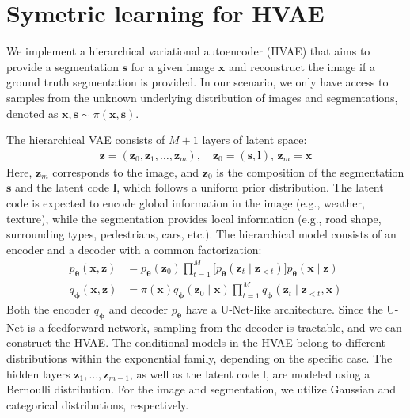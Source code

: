 \section{Symetric learning for HVAE}\label{sec:sym_learning_adaptation}
We implement a hierarchical variational autoencoder (HVAE) that aims to provide a segmentation 
$\mathbf{s}$ for a given image $\mathbf{x}$ and reconstruct the image if a ground truth segmentation is provided. 
In our scenario, we only have access to samples from the unknown underlying distribution of images and
segmentations, denoted as $\mathbf{x}, \mathbf{s} \sim \pi(\mathbf{x},\mathbf{s})$.

The hierarchical VAE consists of $M+1$ layers of latent space:
\begin{align*}
\mathbf{z} = (\mathbf{z}_0, \mathbf{z}_1, \dots, \mathbf{z}_m), \quad \mathbf{z}_0 = (\mathbf{s}, \mathbf{l}),\, \mathbf{z}_m = \mathbf{x}
\end{align*}
Here, $\mathbf{z}_m$ corresponds to the image, and $\mathbf{z}_0$ is the composition of the segmentation $\mathbf{s}$ and 
the latent code $\mathbf{l}$, which follows a uniform prior distribution. The latent code is expected to encode global
information in the image (e.g., weather, texture), while the segmentation provides local information (e.g., road shape,
surrounding types, pedestrians, cars, etc.). The hierarchical model consists of an encoder and
 a decoder with a common factorization:
\begin{align*}
    p_{\boldsymbol{\theta}}(\boldsymbol{x},\boldsymbol{z})&=p_{\boldsymbol{\theta}}(\boldsymbol{z}_{0}) \prod_{t=1}^{M}\bigl[p_{\boldsymbol{\theta}}(\boldsymbol{z}_{t}\mid\boldsymbol{z}_{<t}) \bigr]  p_{\boldsymbol{\theta}}(\boldsymbol{x}\mid\boldsymbol{z})  \\
    q_{\boldsymbol{\phi}}(\boldsymbol{x},\boldsymbol{z}) &=\pi(\boldsymbol{x})q_{\boldsymbol{\phi}}(\boldsymbol{z}_{0}\mid\boldsymbol{x}) \prod_{t=1}^{M}  q_{\boldsymbol{\phi}}(\boldsymbol{z}_{t}\mid\boldsymbol{z}_{<t},\boldsymbol{x}) 
\end{align*}
Both the encoder $q_{\boldsymbol{\phi}}$ and decoder $p_{\boldsymbol{\theta}}$ have a U-Net-like architecture. Since
 the U-Net is a feedforward network, sampling from the decoder is tractable, and we can construct the HVAE. 
 The conditional models in the HVAE belong to different distributions within the exponential family, depending on the 
 specific case. The hidden layers $\mathbf{z}_1, \dots, \mathbf{z}_{m-1}$, as well as the latent 
 code $\mathbf{l}$, are modeled using a Bernoulli distribution. For the image and segmentation, we utilize Gaussian
 and categorical distributions, respectively.
 
